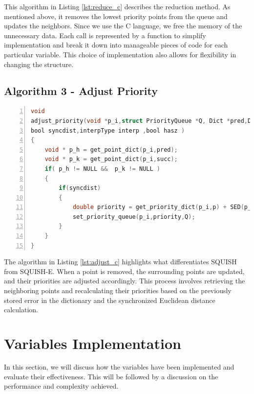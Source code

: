 This algorithm in Listing \ref{lst:reduce_c} describes the reduction method. As mentioned above, it removes the lowest priority points from the queue and updates the neighbors. Since we use the C language, we free the memory of the unnecessary data. Each call is represented by a function to simplify implementation and break it down into manageable pieces of code for each particular variable. This choice of implementation also allows for flexibility in changing the structure.

\subsection{Algorithm 3 - Adjust Priority} 

\begin{lstlisting}[language=C, % Spécifie le langage du code
caption={C code implementation of the adjust\_priority function.}, % Légende du listing
label=lst:adjust_c, % Étiquette pour référencer le listing
numbers=left,
numberstyle=\tiny\color{gray},
stepnumber=1,
frame=single,
breaklines=true,
postbreak=\mbox{\textcolor{red}{$\hookrightarrow$}\space},
showstringspaces=false,
float,
floatplacement=H
]
void
adjust_priority(void *p_i,struct PriorityQueue *Q, Dict *pred,Dict *succ,PDict  *p,
bool syncdist,interpType interp ,bool hasz )
{
	void * p_h = get_point_dict(p_i,pred);
	void * p_k = get_point_dict(p_i,succ);
	if( p_h != NULL &&  p_k != NULL )
	{
		if(syncdist)
		{
			double priority = get_priority_dict(p_i,p) + SED(p_h,p_i,p_k, interp , hasz );
			set_priority_queue(p_i,priority,Q);
		}
	}
}

\end{lstlisting}
 

The algorithm in Listing \ref{lst:adjust_c} highlights what differentiates SQUISH from SQUISH-E. When a point is removed, the surrounding points are updated, and their priorities are adjusted accordingly. This process involves retrieving the neighboring points and recalculating their priorities based on the previously stored error in the dictionary and the synchronized Euclidean distance calculation.


\section{Variables Implementation}
In this section, we will discuss how the variables have been implemented and evaluate their effectiveness. This will be followed by a discussion on the performance and complexity achieved.


